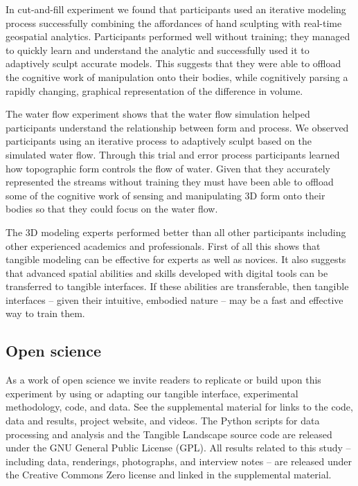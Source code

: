 \documentclass[Afour,sagev,times]{sagej} %
\begin{document}
In cut-and-fill experiment we found that
participants used an iterative modeling process
successfully combining the affordances of hand sculpting
with real-time geospatial analytics. 
Participants performed well without training; 
they managed to quickly learn and 
understand the analytic
and successfully used it to adaptively sculpt
accurate models.
This suggests that they were able to offload the cognitive work 
of manipulation onto their bodies, while cognitively 
parsing a rapidly changing, graphical representation 
of the difference in volume.

The water flow experiment shows 
that the water flow simulation helped participants 
understand the relationship between form and process.
We observed participants using an iterative process
to adaptively sculpt based on the simulated water flow. 
Through this trial and error process 
participants learned how
topographic form controls the flow of water.
Given that they accurately represented the streams without training
they must have been able to offload 
some of the cognitive work of sensing and manipulating 
3D form onto their bodies so that 
they could focus on the water flow. 

The 3D modeling experts 
performed better than all other participants
including other experienced academics and professionals. 
First of all this shows that 
tangible modeling
can be effective for experts as well as novices. 
It also suggests that advanced spatial abilities and skills
developed with digital tools can be transferred
to tangible interfaces. 
If these abilities are transferable, 
then tangible interfaces 
-- given their intuitive, embodied nature --
may be a fast and effective way to train them.

\subsection{Open science} 
As a work of open science we invite readers to
replicate or build upon this experiment by 
using or adapting our tangible interface, 
experimental methodology, code, and data. 
%
See the supplemental material 
for links to the
code,
data and results, 
project website,
and videos.
%
The Python scripts for data processing and analysis 
and the Tangible Landscape source code 
are released under the GNU General Public License (GPL).
All results related to this study 
-- including data, renderings, photographs, and interview notes --
are released under the Creative Commons Zero license
and linked in the supplemental material.
\end{document}
